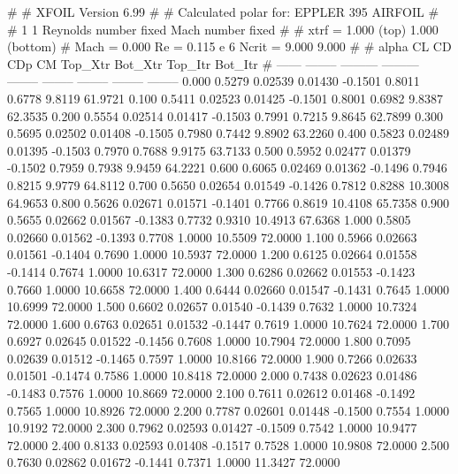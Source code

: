#  
#       XFOIL         Version 6.99
#  
# Calculated polar for: EPPLER 395 AIRFOIL                              
#  
# 1 1 Reynolds number fixed          Mach number fixed         
#  
# xtrf =   1.000 (top)        1.000 (bottom)  
# Mach =   0.000     Re =     0.115 e 6     Ncrit =   9.000  9.000
#  
#   alpha    CL        CD       CDp       CM     Top_Xtr  Bot_Xtr  Top_Itr  Bot_Itr
#  ------ -------- --------- --------- -------- -------- -------- -------- --------
   0.000   0.5279   0.02539   0.01430  -0.1501   0.8011   0.6778   9.8119  61.9721
   0.100   0.5411   0.02523   0.01425  -0.1501   0.8001   0.6982   9.8387  62.3535
   0.200   0.5554   0.02514   0.01417  -0.1503   0.7991   0.7215   9.8645  62.7899
   0.300   0.5695   0.02502   0.01408  -0.1505   0.7980   0.7442   9.8902  63.2260
   0.400   0.5823   0.02489   0.01395  -0.1503   0.7970   0.7688   9.9175  63.7133
   0.500   0.5952   0.02477   0.01379  -0.1502   0.7959   0.7938   9.9459  64.2221
   0.600   0.6065   0.02469   0.01362  -0.1496   0.7946   0.8215   9.9779  64.8112
   0.700   0.5650   0.02654   0.01549  -0.1426   0.7812   0.8288  10.3008  64.9653
   0.800   0.5626   0.02671   0.01571  -0.1401   0.7766   0.8619  10.4108  65.7358
   0.900   0.5655   0.02662   0.01567  -0.1383   0.7732   0.9310  10.4913  67.6368
   1.000   0.5805   0.02660   0.01562  -0.1393   0.7708   1.0000  10.5509  72.0000
   1.100   0.5966   0.02663   0.01561  -0.1404   0.7690   1.0000  10.5937  72.0000
   1.200   0.6125   0.02664   0.01558  -0.1414   0.7674   1.0000  10.6317  72.0000
   1.300   0.6286   0.02662   0.01553  -0.1423   0.7660   1.0000  10.6658  72.0000
   1.400   0.6444   0.02660   0.01547  -0.1431   0.7645   1.0000  10.6999  72.0000
   1.500   0.6602   0.02657   0.01540  -0.1439   0.7632   1.0000  10.7324  72.0000
   1.600   0.6763   0.02651   0.01532  -0.1447   0.7619   1.0000  10.7624  72.0000
   1.700   0.6927   0.02645   0.01522  -0.1456   0.7608   1.0000  10.7904  72.0000
   1.800   0.7095   0.02639   0.01512  -0.1465   0.7597   1.0000  10.8166  72.0000
   1.900   0.7266   0.02633   0.01501  -0.1474   0.7586   1.0000  10.8418  72.0000
   2.000   0.7438   0.02623   0.01486  -0.1483   0.7576   1.0000  10.8669  72.0000
   2.100   0.7611   0.02612   0.01468  -0.1492   0.7565   1.0000  10.8926  72.0000
   2.200   0.7787   0.02601   0.01448  -0.1500   0.7554   1.0000  10.9192  72.0000
   2.300   0.7962   0.02593   0.01427  -0.1509   0.7542   1.0000  10.9477  72.0000
   2.400   0.8133   0.02593   0.01408  -0.1517   0.7528   1.0000  10.9808  72.0000
   2.500   0.7630   0.02862   0.01672  -0.1441   0.7371   1.0000  11.3427  72.0000
